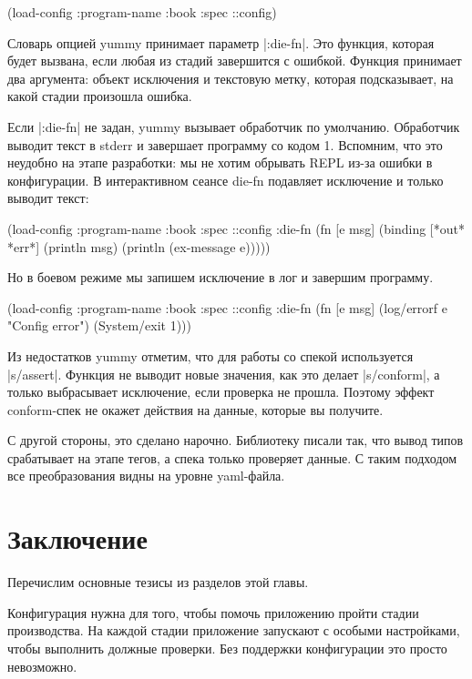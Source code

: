 \begin{code}
(load-config {:program-name :book
              :spec ::config})
\end{code}

Словарь опцией yummy принимает параметр \spverb|:die-fn|. Это функция, которая будет
вызвана, если любая из стадий завершится с ошибкой. Функция принимает два
аргумента: объект исключения и текстовую метку, которая подсказывает, на какой
стадии произошла ошибка.

Если \spverb|:die-fn| не задан, yummy вызывает обработчик по умолчанию. Обработчик
выводит текст в stderr и завершает программу со кодом 1. Вспомним, что это
неудобно на этапе разработки: мы не хотим обрывать REPL из-за ошибки в
конфигурации. В интерактивном сеансе die-fn подавляет исключение и только
выводит текст:

\begin{code}
(load-config
 {:program-name :book
  :spec ::config
  :die-fn (fn [e msg]
            (binding [*out* *err*]
              (println msg)
              (println (ex-message e))))})
\end{code}

Но в боевом режиме мы запишем исключение в лог и завершим программу.

\begin{code}
(load-config
 {:program-name :book
  :spec ::config
  :die-fn (fn [e msg]
            (log/errorf e "Config error")
            (System/exit 1))})
\end{code}

Из недостатков yummy отметим, что для работы со спекой используется
\spverb|s/assert|. Функция не выводит новые значения, как это делает
\spverb|s/conform|, а только выбрасывает исключение, если проверка не
прошла. Поэтому эффект conform-спек не окажет действия на данные, которые вы
получите.

С другой стороны, это сделано нарочно. Библиотеку писали так, что вывод типов
срабатывает на этапе тегов, а спека только проверяет данные. С таким подходом
все преобразования видны на уровне yaml-файла.

\section{Заключение}

Перечислим основные тезисы из разделов этой главы.

Конфигурация нужна для того, чтобы помочь приложению пройти стадии
производства. На каждой стадии приложение запускают с особыми настройками, чтобы
выполнить должные проверки. Без поддержки конфигурации это просто невозможно.


